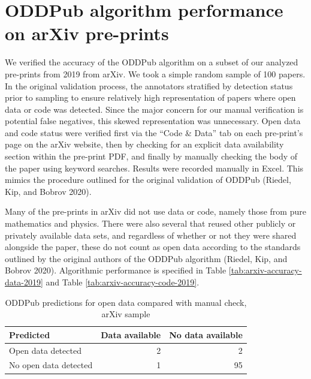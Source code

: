 \documentclass[
]{article}
\begin{document}
\hypertarget{oddpub-algorithm-performance-on-arxiv-pre-prints}{%
\section{ODDPub algorithm performance on arXiv pre-prints}\label{oddpub-algorithm-performance-on-arxiv-pre-prints}}

We verified the accuracy of the ODDPub algorithm on a subset of our analyzed pre-prints from 2019 from arXiv. We took a simple random sample of 100 papers. In the original validation process, the annotators stratified by detection status prior to sampling to ensure relatively high representation of papers where open data or code was detected. Since the major concern for our manual verification is potential false negatives, this skewed representation was unnecessary. Open data and code status were verified first via the ``Code \& Data'' tab on each pre-print's page on the arXiv website, then by checking for an explicit data availability section within the pre-print PDF, and finally by manually checking the body of the paper using keyword searches. Results were recorded manually in Excel. This mimics the procedure outlined for the original validation of ODDPub (Riedel, Kip, and Bobrov 2020).

Many of the pre-prints in arXiv did not use data or code, namely those from pure mathematics and physics. There were also several that reused other publicly or privately available data sets, and regardless of whether or not they were shared alongside the paper, these do not count as open data according to the standards outlined by the original authors of the ODDPub algorithm (Riedel, Kip, and Bobrov 2020). Algorithmic performance is specified in Table \ref{tab:arxiv-accuracy-data-2019} and Table \ref{tab:arxiv-accuracy-code-2019}.

\begin{table}

\caption{\label{tab:arxiv-confusion-data-2019}ODDPub predictions for open data compared with manual check, arXiv sample}
\centering
\begin{tabular}[t]{l|r|r}
\hline
Predicted & Data available & No data available\\
\hline
Open data detected & 2 & 2\\
\hline
No open data detected & 1 & 95\\
\hline
\end{tabular}
\end{table}
\end{document}
